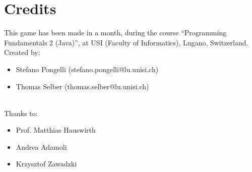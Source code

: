 \documentclass[12pt]{article}
\begin{document}
\newpage
\section{Credits}
\label{sec:credits}
This game has been made in a month, during the course ``Programming Fundamentals 2 (Java)'', at USI (Faculty of Informatics), Lugano, Switzerland.\\

Created by:
\begin{itemize}
\item Stefano Pongelli (stefano.pongelli@lu.unisi.ch)
\item Thomas Selber (thomas.selber@lu.unisi.ch)
\end{itemize}

~\\

Thanks to:
\begin{itemize}
\item Prof. Matthias Hauswirth
\item Andrea Adamoli
\item Krzysztof Zawadzki
\end{itemize}
\end{document}
